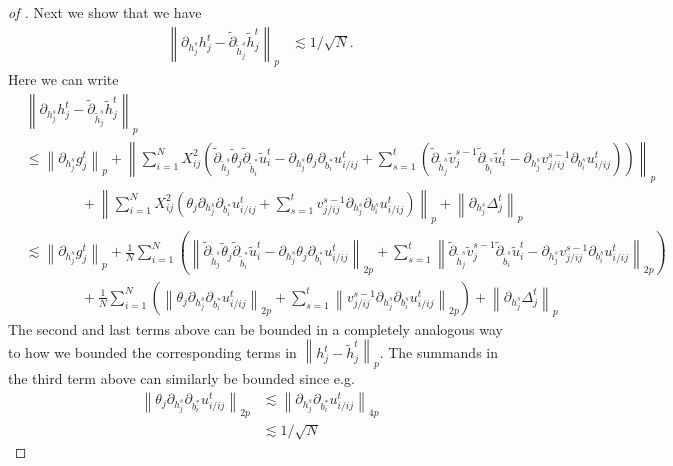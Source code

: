 \documentclass{article}
\newcommand{\1}{\mathbbm{1}}
\newcommand{\norm}[1]{\left\lVert#1\right\rVert}
\theoremstyle{plain}
\theoremstyle{definition}
\theoremstyle{remark}
\begin{document}
\begin{proof}[of ]
    Next we show that we have 
    \begin{align*}
        \norm{\partial_{ h_j^s} h_j^t - \tilde{\partial}_{\tilde{ h}_j^s}\tilde{ h}_j^t}_p &\lesssim 1/\sqrt{N}.
    \end{align*}
    Here we can write 
    \begin{align}
        &\norm{\partial_{ h_j^s} h_j^t - \tilde{\partial}_{\tilde{ h}_j^s}\tilde{ h}_j^t}_p \nonumber\\
        &\leq \norm{\partial_{ h_j^s} g_j^t}_p + \norm{\sum_{i=1}^N X_{ij}^2\left(\tilde{\partial}_{\tilde{ h}_j^s}\tilde{\theta}_j \tilde{\partial}_{\tilde{b}_i^*} \tilde{u}_i^t - \partial_{ h_j^s}\theta_j \partial_{b_i^*}u_{i/ij}^t + \sum_{s=1}^t (\tilde{\partial}_{\tilde{ h}_j^s}\tilde{v}_j^{s-1} \tilde{\partial}_{\tilde{b}_i^s} \tilde{u}_i^t - \partial_{ h_j^s}v_{j/ij}^{s-1} \partial_{b_i^s}u_{i/ij}^t )\right)}_p \nonumber\\
        &\qquad \qquad + \norm{\sum_{i=1}^N X_{ij}^2\left( \theta_j \partial_{ h_j^s}\partial_{b_i^*}u_{i/ij}^t + \sum_{s=1}^t v_{j/ij}^{s-1} \partial_{ h_j^s}\partial_{b_i^s}u_{i/ij}^t \right)}_p + \norm{\partial_{ h_j^s} \Delta_j^t}_p \nonumber\\
        &\lesssim \norm{\partial_{ h_j^s} g_j^t}_p + \frac{1}{N}\sum_{i=1}^N \left(\norm{\tilde{\partial}_{\tilde{ h}_j^s}\tilde{\theta}_j \tilde{\partial}_{\tilde{b}_i^*} \tilde{u}_i^t - \partial_{ h_j^s}\theta_j \partial_{b_i^*}u_{i/ij}^t}_{2p} + \sum_{s=1}^t \norm{\tilde{\partial}_{\tilde{ h}_j^s}\tilde{v}_j^{s-1} \tilde{\partial}_{\tilde{b}_i^s} \tilde{u}_i^t - \partial_{ h_j^s}v_{j/ij}^{s-1} \partial_{b_i^s}u_{i/ij}^t }_{2p} \right) \nonumber\\
        &\qquad \qquad + \frac{1}{N}\sum_{i=1}^N\left(\norm{ \theta_j \partial_{ h_j^s}\partial_{b_i^*}u_{i/ij}^t}_{2p} + \sum_{s=1}^t\norm{ v_{j/ij}^{s-1} \partial_{ h_j^s}\partial_{b_i^s}u_{i/ij}^t }_{2p} \right)+ \norm{\partial_{ h_j^s} \Delta_j^t}_p \label{eq:h-partials-difference} 
    \end{align}
    The second and last terms above can be bounded in a completely analogous way to how we bounded the corresponding terms in $\norm{h_j^t - \tilde{h}_j^t}_p$. The summands in the third term above can similarly be bounded since e.g.
    \begin{align*}
        \norm{ \theta_j \partial_{ h_j^s}\partial_{b_i^*}u_{i/ij}^t}_{2p} &\lesssim \norm{  \partial_{ h_j^s}\partial_{b_i^*}u_{i/ij}^t}_{4p}\\
        &\lesssim 1/\sqrt{N}
    \end{align*}

\end{proof}
\end{document}
